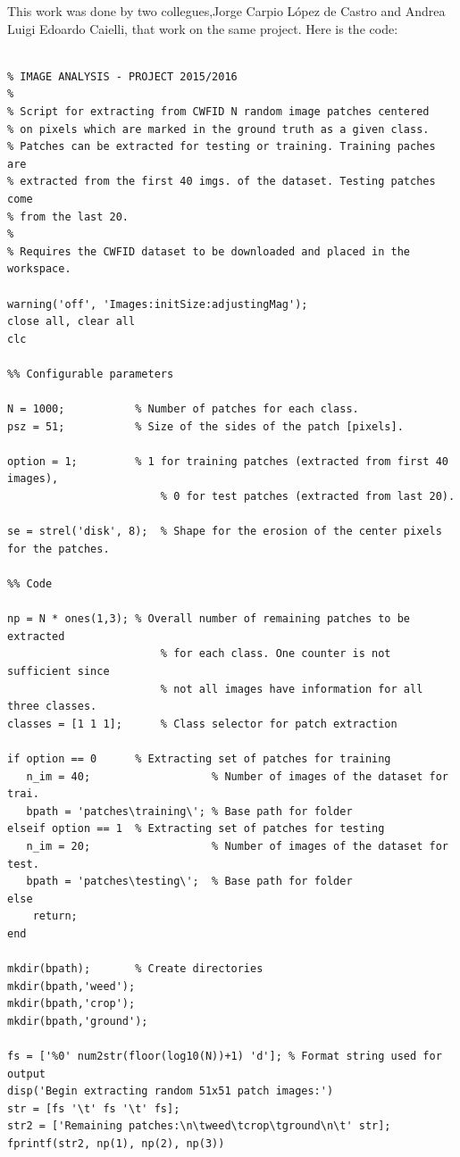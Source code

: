 \documentclass[]{report}
\begin{document}
This work was done by two collegues,Jorge Carpio López de Castro and  Andrea Luigi Edoardo Caielli, that work on the same project. 
Here is the code:

\begin{lstlisting}

% IMAGE ANALYSIS - PROJECT 2015/2016
%
% Script for extracting from CWFID N random image patches centered
% on pixels which are marked in the ground truth as a given class.
% Patches can be extracted for testing or training. Training paches are
% extracted from the first 40 imgs. of the dataset. Testing patches come
% from the last 20.
%
% Requires the CWFID dataset to be downloaded and placed in the workspace.

warning('off', 'Images:initSize:adjustingMag');
close all, clear all
clc

%% Configurable parameters

N = 1000;           % Number of patches for each class.
psz = 51;           % Size of the sides of the patch [pixels].

option = 1;         % 1 for training patches (extracted from first 40 images),
                        % 0 for test patches (extracted from last 20).
                        
se = strel('disk', 8);  % Shape for the erosion of the center pixels for the patches.

%% Code

np = N * ones(1,3); % Overall number of remaining patches to be extracted 
                        % for each class. One counter is not sufficient since
                        % not all images have information for all three classes.
classes = [1 1 1];      % Class selector for patch extraction

if option == 0      % Extracting set of patches for training
   n_im = 40;                   % Number of images of the dataset for trai.
   bpath = 'patches\training\'; % Base path for folder
elseif option == 1  % Extracting set of patches for testing
   n_im = 20;                   % Number of images of the dataset for test.
   bpath = 'patches\testing\';  % Base path for folder
else
    return;
end

mkdir(bpath);       % Create directories
mkdir(bpath,'weed'); 
mkdir(bpath,'crop'); 
mkdir(bpath,'ground');

fs = ['%0' num2str(floor(log10(N))+1) 'd']; % Format string used for output
disp('Begin extracting random 51x51 patch images:')
str = [fs '\t' fs '\t' fs];
str2 = ['Remaining patches:\n\tweed\tcrop\tground\n\t' str];
fprintf(str2, np(1), np(2), np(3))


\end{lstlisting}
\end{document}
